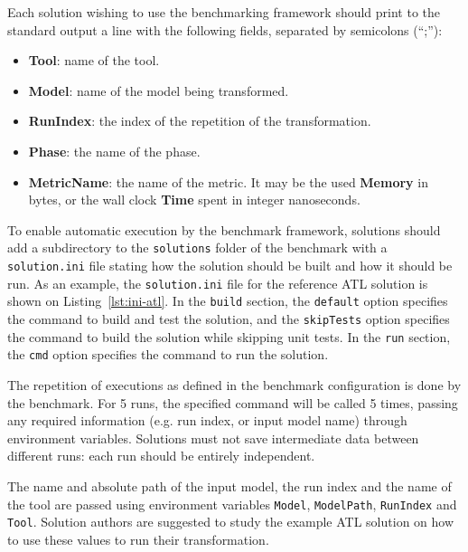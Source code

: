 \documentclass[a4paper]{scrartcl}
\newcommand*{\file}[1]{\texttt{#1}}
\begin{document}
Each solution wishing to use the benchmarking framework should print to the
standard output a line with the following fields, separated by semicolons
(``;''):

\begin{itemize}
\item \textbf{Tool}: name of the tool.
\item \textbf{Model}: name of the model being transformed.
\item \textbf{RunIndex}: the index of the repetition of the transformation.
\item \textbf{Phase}: the name of the phase.
\item \textbf{MetricName}: the name of the metric. It may be the used
  \textbf{Memory} in bytes, or the wall clock \textbf{Time} spent in integer
  nanoseconds.
\end{itemize}



To enable automatic execution by the benchmark framework, solutions should add a
subdirectory to the \file{solutions} folder of the benchmark with a
\file{solution.ini} file stating how the solution should be built and how it
should be run. As an example, the \file{solution.ini} file for the reference ATL
solution is shown on Listing~\ref{lst:ini-atl}. In the \file{build} section, the
\file{default} option specifies the command to build and test the solution, and
the \file{skipTests} option specifies the command to build the solution while
skipping unit tests. In the \file{run} section, the \file{cmd} option specifies
the command to run the solution.

The repetition of executions as defined in the benchmark configuration is done
by the benchmark. For 5 runs, the specified command will be called 5 times,
passing any required information (e.g. run index, or input model name) through
environment variables. Solutions must not save intermediate data between
different runs: each run should be entirely independent.

The name and absolute path of the input model, the run index and the name of the
tool are passed using environment variables \file{Model}, \file{ModelPath},
\file{RunIndex} and \file{Tool}. Solution authors are suggested to study the
example ATL solution on how to use these values to run their transformation.
\end{document}
